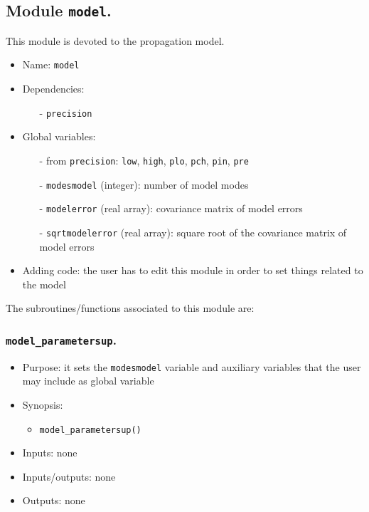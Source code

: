 \documentclass[12pt]{article}
\begin{document}
\subsection{Module {\tt model}.}
This module is devoted to the propagation model.
\begin{itemize}
\item Name: {\tt model}
\item Dependencies: 
\begin{itemize}
\item[-] {\tt precision}
\end{itemize}
\item Global variables: 
\begin{itemize}
\item[-] from {\tt precision}: {\tt low}, {\tt high}, {\tt plo}, {\tt pch}, {\tt pin}, {\tt pre} 
\item[-] {\tt modesmodel} (integer): number of model modes
\item[-] {\tt modelerror} (real array): covariance matrix of model errors
\item[-] {\tt sqrtmodelerror} (real array): square root of the covariance matrix of model errors
\end{itemize}
\item Adding code: the user has to edit this module in order to set things related to the model
\end{itemize}

The subroutines/functions associated to this module are:

\subsubsection{{\tt model\_parametersup}.}
\begin{itemize}
\item Purpose: it sets the {\tt modesmodel} variable and auxiliary variables that the user may include as global variable
\item Synopsis: 
\begin{itemize}
\item {\tt model\_parametersup()}
\end{itemize}
\item Inputs: none
\item Inputs/outputs: none
\item Outputs: none
\end{itemize} 
\end{document}
